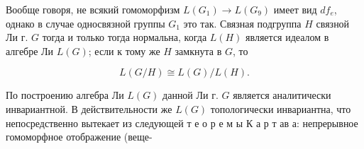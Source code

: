 \documentclass[10pt]{article}
\begin{document}
Вообще говоря, не всякий гомоморфизм $L\left(G_{1}\right) \rightarrow L\left(G_{9}\right)$ имеет вид $d f_{e}$, однако в случае односвязной группы $G_{1}$ это так. Связная подгруппа $H$ связной Ли г. $G$ тогда и только тогда нормальна, когда $L(H)$ является идеалом в алгебре Ли $L(G)$; если к тому же $H$ замкнута в $G$, то



\[

L(G / H) \cong L(G) / L(H) .

\]



По построению алгебра Ли $L(G)$ данной Ли г. $G$ является аналитически инвариантной. В действительности же $L(G)$ топологически инвариантна, что непосредственно вытекает из следующей т е о р е м ы $К$ а р т ав а: непрерывное гомоморфное отображение (веще-
\end{document}
